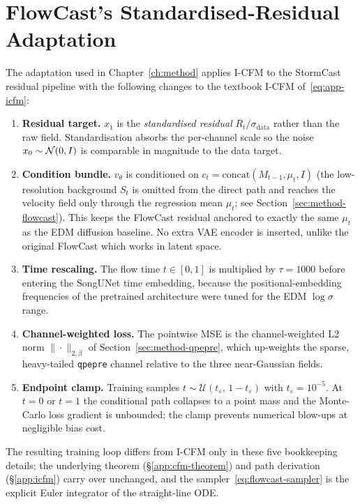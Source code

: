 \section{FlowCast's Standardised-Residual Adaptation}
\label{app:flowcast-adaptation}

The adaptation used in Chapter~\ref{ch:method} applies I-CFM to the StormCast residual pipeline with the following changes to the textbook I-CFM of~\eqref{eq:app-icfm}:
\begin{enumerate}
  \item \textbf{Residual target.} $x_1$ is the \emph{standardised residual} $R_t / \sigma_{\text{data}}$ rather than the raw field. Standardisation absorbs the per-channel scale so the noise $x_0 \sim \mathcal{N}(0, I)$ is comparable in magnitude to the data target.
  \item \textbf{Condition bundle.} $v_\theta$ is conditioned on $c_t = \mathrm{concat}(M_{t-1}, \mu_t, I)$ (the low-resolution background $S_t$ is omitted from the direct path and reaches the velocity field only through the regression mean $\mu_t$; see Section~\ref{sec:method-flowcast}). This keeps the FlowCast residual anchored to exactly the same $\mu_t$ as the EDM diffusion baseline. No extra VAE encoder is inserted, unlike the original FlowCast which works in latent space.
  \item \textbf{Time rescaling.} The flow time $t \in [0, 1]$ is multiplied by $\tau = 1000$ before entering the SongUNet time embedding, because the positional-embedding frequencies of the pretrained architecture were tuned for the EDM $\log\sigma$ range.
  \item \textbf{Channel-weighted loss.} The pointwise MSE is the channel-weighted L2 norm $\|\cdot\|_{2, \beta}$ of Section~\ref{sec:method-qpepre}, which up-weights the sparse, heavy-tailed \texttt{qpepre} channel relative to the three near-Gaussian fields.
  \item \textbf{Endpoint clamp.} Training samples $t \sim \mathcal{U}(t_\varepsilon,\, 1 - t_\varepsilon)$ with $t_\varepsilon = 10^{-5}$. At $t = 0$ or $t = 1$ the conditional path collapses to a point mass and the Monte-Carlo loss gradient is unbounded; the clamp prevents numerical blow-ups at negligible bias cost.
\end{enumerate}
The resulting training loop differs from I-CFM only in these five bookkeeping details; the underlying theorem (\S\ref{app:cfm-theorem}) and path derivation (\S\ref{app:icfm}) carry over unchanged, and the sampler~\eqref{eq:flowcast-sampler} is the explicit Euler integrator of the straight-line ODE.

